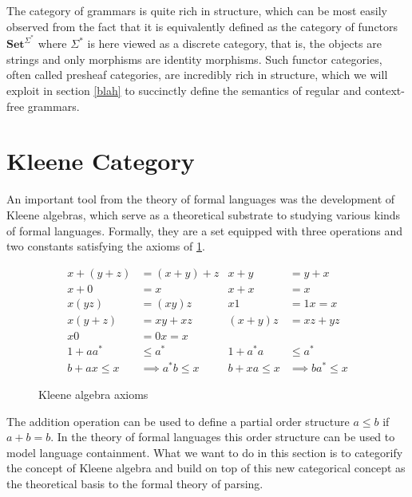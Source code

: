 \documentclass[sigconf,anonymous,review,screen]{acmart}
\newcommand{\Set}{\mathbf{Set}}
\newif\ifdraft
\newcommand{\steven}[1]{\ifdraft{\color{orange}[{\bf Steven}: #1]}\fi}
\begin{document}
The category of grammars is quite rich in structure, which can be most
easily observed from the fact that it is equivalently defined as the
category of functors $\Set^{\Sigma^*}$ where $\Sigma^*$ is here viewed
as a discrete category, that is, the objects are strings and only
morphisms are identity morphisms. Such functor categories, often
called presheaf categories, are incredibly rich in structure, which we
will exploit in section \ref{blah} to succinctly define the semantics
of regular and context-free grammars. \steven{Topoi model dependent type theory. This dependence is seemingly useful for also reasoning about context sensitivity, but this doesn't work for \textit{reasons}, right?}

\section{Kleene Category}

An important tool from the theory of formal languages was the development
of Kleene algebras, which serve as a theoretical substrate to studying
various kinds of formal languages. Formally, they are a set equipped
with three operations and two constants satisfying the axioms of
\ref{fig:axioms}.

\begin{figure}
  \begin{align*}
    x + (y + z) &= (x + y) + z & x + y &= y + x\\
    x + 0 &= x & x + x &= x\\
    x(yz) &= (xy)z & x1 &= 1x = x\\
    x(y + z) &= xy + xz & (x + y)z &= xz + yz\\
    x0 &= 0x = x & & \\
    1 + aa^* &\leq a^* & 1 + a^*a &\leq a^*\\
     b + ax \leq x &\implies a^*b \leq x &  b + xa \leq x &\implies ba^* \leq x
  \end{align*}
  \label{fig:axioms}
  \caption{Kleene algebra axioms}
\end{figure}


The addition operation can be used to define a partial order structure
$a \leq b$ if $a + b = b$. In the theory of formal languages this
order structure can be used to model language containment. What we
want to do in this section is to categorify the concept of Kleene
algebra and build on top of this new categorical concept as the
theoretical basis to the formal theory of parsing.
\end{document}
